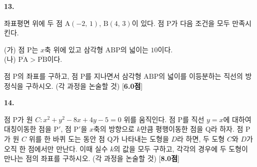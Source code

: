 \documentclass[10pt]{article}
\renewenvironment{problem}[2]{%
  \par\setcounter{probnum}{#1}%
  \noindent
  \begin{minipage}[t]{\linewidth}%
  \raggedright%
  \setlength{\parskip}{4pt plus 1pt}%
  {\sffamily\bfseries\large\color{black}#1.}\hspace{4pt}\ignorespaces
}{%
  \end{minipage}\par%
}
\newcommand{\pts}[1]{%
  \nobreak\hspace*{\fill}%
  \mbox{\sffamily\small\color{black}[\textbf{#1점}]}%
  \par%
}
\begin{document}

\setlength{\probboxheight}{195mm}

\noindent
\begin{minipage}[t][\probboxheight][t]{0.46\linewidth}\raggedright
\begin{problem}{13}{s}
좌표평면 위에 두 점 $\mathrm{A}(-2,\,1)$, $\mathrm{B}(4,\,3)$이 있다. 점 $\mathrm{P}$가 다음 조건을 모두 만족시킨다.
\begin{conditions}
(가) 점 $\mathrm{P}$는 $x$축 위에 있고 삼각형 $\mathrm{ABP}$의 넓이는 $10$이다.\\
(나) $\overline{\mathrm{PA}}>\overline{\mathrm{PB}}$이다.
\end{conditions}
점 $\mathrm{P}$의 좌표를 구하고, 점 $\mathrm{P}$를 지나면서 삼각형 $\mathrm{ABP}$의 넓이를 이등분하는 직선의 방정식을 구하시오. (각 과정을 논술할 것) \pts{6.0}
\end{problem}
\end{minipage}%
\hfill
\begin{minipage}[t][\probboxheight][t]{0.46\linewidth}\raggedright
\begin{problem}{14}{s}
점 $\mathrm{P}$가 원 $C:x^{2}+y^{2}-8x+4y-5=0$ 위를 움직인다. 점 $\mathrm{P}$를 직선 $y=x$에 대하여 대칭이동한 점을 $\mathrm{P}'$, 점 $\mathrm{P}'$을 $x$축의 방향으로 $k$만큼 평행이동한 점을 $\mathrm{Q}$라 하자. 점 $\mathrm{P}$가 원 $C$ 위를 한 바퀴 도는 동안 점 $\mathrm{Q}$가 나타내는 도형을 $D$라 하면, 두 도형 $C$와 $D$가 오직 한 점에서만 만난다. 이때 실수 $k$의 값을 모두 구하고, 각각의 경우에 두 도형이 만나는 점의 좌표를 구하시오. (각 과정을 논술할 것) \pts{8.0}
\end{problem}
\end{minipage}

\clearpage
\end{document}
